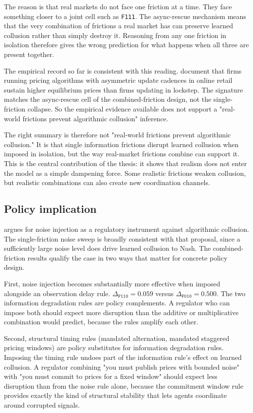 The reason is that real markets do not face one friction at a time. They face something closer to a joint cell such as \texttt{F111}. The async-rescue mechanism means that the very combination of frictions a real market has can preserve learned collusion rather than simply destroy it. Reasoning from any one friction in isolation therefore gives the wrong prediction for what happens when all three are present together.

The empirical record so far is consistent with this reading. \citet{brown2023} document that firms running pricing algorithms with asymmetric update cadences in online retail sustain higher equilibrium prices than firms updating in lockstep. The signature matches the async-rescue cell of the combined-friction design, not the single-friction collapse. So the empirical evidence available does not support a "real-world frictions prevent algorithmic collusion" inference.

The right summary is therefore not "real-world frictions prevent algorithmic collusion." It is that single information frictions disrupt learned collusion when imposed in isolation, but the way real-market frictions combine can support it. This is the central contribution of the thesis: it shows that realism does not enter the model as a simple dampening force. Some realistic frictions weaken collusion, but realistic combinations can also create new coordination channels.

\subsection{Policy implication}

\citet{zhang2025} argues for noise injection as a regulatory instrument against algorithmic collusion. The single-friction noise sweep is broadly consistent with that proposal, since a sufficiently large noise level does drive learned collusion to Nash. The combined-friction results qualify the case in two ways that matter for concrete policy design.

First, noise injection becomes substantially more effective when imposed alongside an observation delay rule. $\Delta_{\texttt{F110}} = 0.059$ versus $\Delta_{\texttt{F010}} = 0.500$. The two information degradation rules are policy complements. A regulator who can impose both should expect more disruption than the additive or multiplicative combination would predict, because the rules amplify each other.

Second, structural timing rules (mandated alternation, mandated staggered pricing windows) are policy substitutes for information degradation rules. Imposing the timing rule undoes part of the information rule's effect on learned collusion. A regulator combining "you must publish prices with bounded noise" with "you must commit to prices for a fixed window" should expect less disruption than from the noise rule alone, because the commitment window rule provides exactly the kind of structural stability that lets agents coordinate around corrupted signals.

